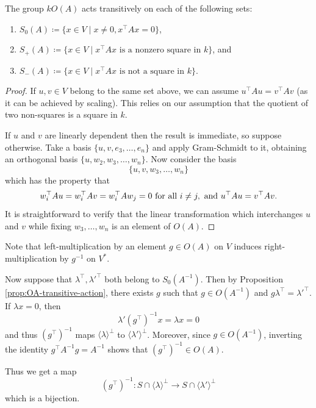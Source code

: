 \begin{prop}\label{prop:OA-transitive-action}
	The group $kO(A)$ acts transitively on each of the following sets:
	\begin{enumerate}
		\item $S_0(A) \coloneqq \{x \in V \mid x\neq 0, x^\top A x = 0\}$,
		\item $S_+(A) \coloneqq \{ x\in V \mid x^\top A x \text{ is a nonzero square in } k\}$, and
		\item $S_-(A) \coloneqq \{ x\in V \mid x^\top A x \text{ is not a square in } k\}$.
	\end{enumerate}
\end{prop}
\begin{proof}
	If $u,v\in V$ belong to the same set above, we can assume $u^\top A u = v^\top A v$ (as it can be achieved by scaling). This relies on our assumption that the quotient of two non-squares is a square in $k$.
	
	If $u$ and $v$ are linearly dependent then the result is immediate, so suppose otherwise. Take a basis $\{u,v,e_3,\ldots,e_n\}$ and apply Gram-Schmidt to it, obtaining an orthogonal basis $\{u, w_2, w_3, \ldots,w_n\}$. Now consider the basis
	\[
		\{u,v,w_3,\ldots,w_n\}
	\]
	which has the property that
	\[
		w_i^\top A u = w_i^\top A v = w_i^\top A w_j = 0 \text{ for all } i \neq j, \text{ and }\\
		u^\top A u = v^\top A v.
	\]
	It is straightforward to verify that the linear transformation which interchanges $u$ and $v$ while fixing $w_3,\ldots,w_n$ is an element of $O(A)$.
\end{proof}

Note that left-multiplication by an element $g \in O(A)$ on $V$ induces right-multiplication by $g^{-1}$ on $V^*$.

Now suppose that $\lambda^\top,\lambda'^\top$ both belong to $S_0(A^{-1})$. Then by Proposition \ref{prop:OA-transitive-action}, there exists $g$ such that $g \in O(A^{-1})$ and $g \lambda^\top = \lambda'^\top$. If $\lambda x = 0$, then
\[
	\lambda' (g^\top)^{-1} x = \lambda x = 0
\]
and thus $(g^\top)^{-1}$ maps $\langle \lambda \rangle^\bot$ to $\langle \lambda' \rangle^\bot$. Moreover, since $g \in O(A^{-1})$, inverting the identity $g^\top A^{-1} g = A^{-1}$ shows that $(g^\top)^{-1} \in O(A)$.

Thus we get a map
\[
	(g^\top)^{-1} \colon S \cap \langle \lambda \rangle^\bot \to S \cap \langle \lambda' \rangle^\bot
\]
which is a bijection.

